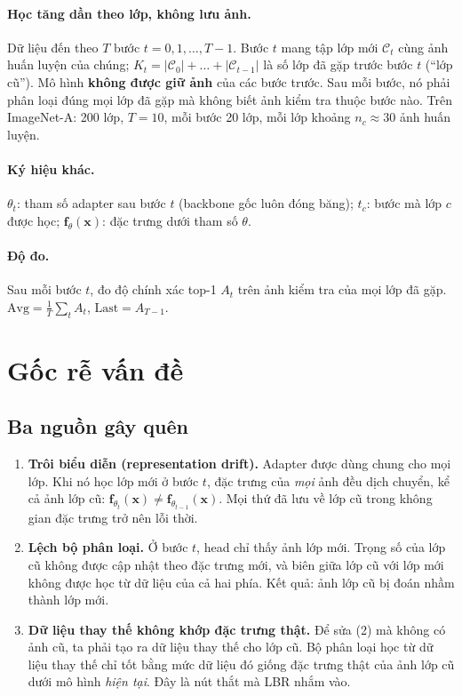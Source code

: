 \documentclass[11pt]{article}
\newcommand{\vf}{\mathbf{f}}
\newcommand{\vx}{\mathbf{x}}
\begin{document}
\paragraph{Học tăng dần theo lớp, không lưu ảnh.} Dữ liệu đến theo $T$ bước $t=0,1,\dots,T-1$. Bước $t$ mang tập lớp mới
$\mathcal{C}_t$ cùng ảnh huấn luyện của chúng; $K_t=|\mathcal{C}_0|+\dots+|\mathcal{C}_{t-1}|$ là số lớp đã gặp trước
bước $t$ (``lớp cũ''). Mô hình \textbf{không được giữ ảnh} của các bước trước. Sau mỗi bước, nó phải phân loại đúng mọi
lớp đã gặp mà không biết ảnh kiểm tra thuộc bước nào. Trên ImageNet-A: 200 lớp, $T=10$, mỗi bước 20 lớp, mỗi lớp
khoảng $n_c\approx30$ ảnh huấn luyện.

\paragraph{Ký hiệu khác.} $\theta_t$: tham số adapter sau bước $t$ (backbone gốc luôn đóng băng); $t_c$: bước mà lớp
$c$ được học; $\vf_{\theta}(\vx)$: đặc trưng dưới tham số $\theta$.

\paragraph{Độ đo.} Sau mỗi bước $t$, đo độ chính xác top-1 $A_t$ trên ảnh kiểm tra của mọi lớp đã gặp. $\text{Avg} =
\frac1T\sum_t A_t$, $\text{Last}=A_{T-1}$.

\section{Gốc rễ vấn đề}\label{sec:problem}

\subsection{Ba nguồn gây quên}\label{sec:three}
\begin{enumerate}
\item \textbf{Trôi biểu diễn (representation drift).} Adapter được dùng chung cho mọi lớp. Khi nó học lớp mới ở bước
      $t$, đặc trưng của \emph{mọi} ảnh đều dịch chuyển, kể cả ảnh lớp cũ: $\vf_{\theta_t}(\vx)\ne\vf_{\theta_{t-1}}(\vx)$.
      Mọi thứ đã lưu về lớp cũ trong không gian đặc trưng trở nên lỗi thời.
\item \textbf{Lệch bộ phân loại.} Ở bước $t$, head chỉ thấy ảnh lớp mới. Trọng số của lớp cũ không được cập nhật theo
      đặc trưng mới, và biên giữa lớp cũ với lớp mới không được học từ dữ liệu của cả hai phía. Kết quả: ảnh lớp cũ bị
      đoán nhầm thành lớp mới.
\item \textbf{Dữ liệu thay thế không khớp đặc trưng thật.} Để sửa (2) mà không có ảnh cũ, ta phải tạo ra dữ liệu thay
      thế cho lớp cũ. Bộ phân loại học từ dữ liệu thay thế chỉ tốt bằng mức dữ liệu đó giống đặc trưng thật của ảnh lớp
      cũ dưới mô hình \emph{hiện tại}. Đây là nút thắt mà LBR nhắm vào.
\end{enumerate}
\end{document}
